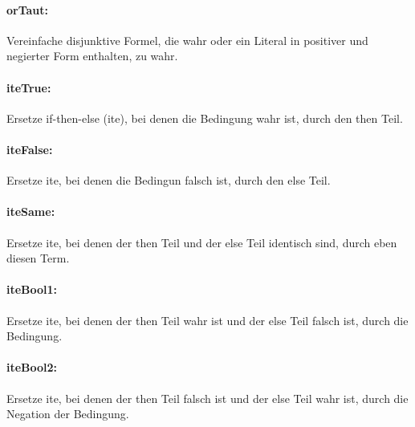 \documentclass[a4paper]{article}
\begin{document}
\paragraph{orTaut:} Vereinfache disjunktive Formel, die wahr oder ein Literal in positiver und negierter Form enthalten, zu wahr.
\begin{mathpar}
\end{mathpar}

\paragraph{iteTrue:} Ersetze if-then-else (ite), bei denen die Bedingung wahr ist, durch den then Teil.
\begin{mathpar}
\end{mathpar}

\paragraph{iteFalse:} Ersetze ite, bei denen die Bedingun falsch ist, durch den else Teil.
\begin{mathpar}
\end{mathpar}
\paragraph{iteSame:} Ersetze ite, bei denen der then Teil und der else Teil identisch sind, durch eben diesen Term.
\begin{mathpar}
\end{mathpar}
\paragraph{iteBool1:} Ersetze ite, bei denen der then Teil wahr ist und der else Teil falsch ist, durch die Bedingung.
\begin{mathpar}
\end{mathpar}
\paragraph{iteBool2:} Ersetze ite, bei denen der then Teil falsch ist und der else Teil wahr ist, durch die Negation der Bedingung.
\begin{mathpar}
\end{mathpar}
\end{document}
